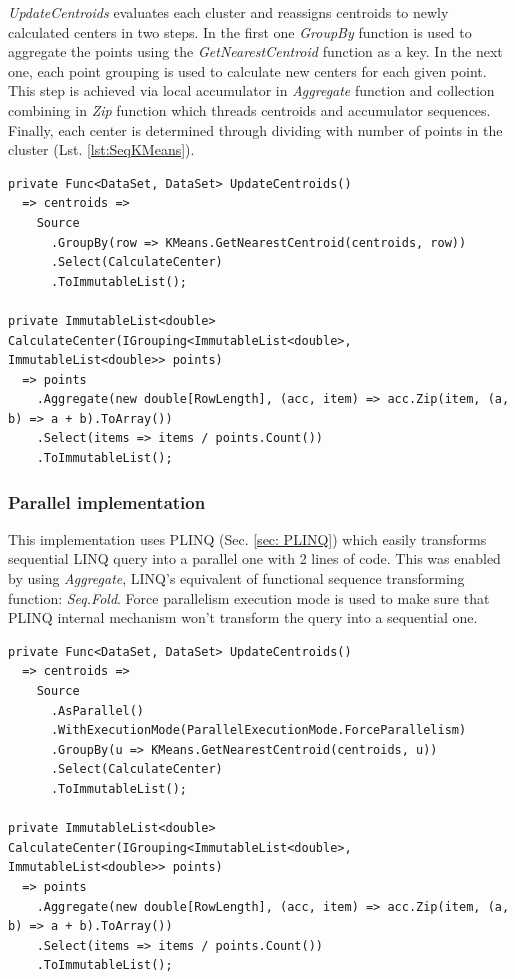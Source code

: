 \emph{UpdateCentroids} evaluates each cluster and reassigns centroids to newly calculated centers in two steps. In the first one \emph{GroupBy} function is used to aggregate the points using the \emph{GetNearestCentroid} function as a key. In the next one, each point grouping is used to calculate new centers for each given point. This step is achieved via local accumulator in \emph{Aggregate} function and collection combining in \emph{Zip} function which threads centroids and accumulator sequences. Finally, each center is determined through dividing with number of points in the cluster (Lst. \ref{lst:SeqKMeans}).


\begin{lstlisting}[style=sharpcstyle, caption={Sequential k-means algorithm}, label={lst:SeqKMeans}]
private Func<DataSet, DataSet> UpdateCentroids()
  => centroids =>
    Source
      .GroupBy(row => KMeans.GetNearestCentroid(centroids, row))
      .Select(CalculateCenter)
      .ToImmutableList();

private ImmutableList<double> CalculateCenter(IGrouping<ImmutableList<double>, ImmutableList<double>> points) 
  => points
    .Aggregate(new double[RowLength], (acc, item) => acc.Zip(item, (a, b) => a + b).ToArray())
    .Select(items => items / points.Count())
    .ToImmutableList();
\end{lstlisting}

\subsubsection{Parallel implementation}

This implementation uses PLINQ (Sec. \ref{sec: PLINQ}) which easily transforms sequential LINQ query into a parallel one with 2 lines of code.
This was enabled by using \emph{Aggregate}, LINQ's equivalent of functional sequence transforming function: \emph{Seq.Fold}. Force parallelism execution mode is used to make sure that PLINQ internal mechanism won't transform the query into a sequential one.

\begin{lstlisting}[style=sharpcstyle, caption={Parallel k-means algorithm}, label={lst:ParKMeans}]
private Func<DataSet, DataSet> UpdateCentroids()
  => centroids =>
    Source
      .AsParallel()
      .WithExecutionMode(ParallelExecutionMode.ForceParallelism)
      .GroupBy(u => KMeans.GetNearestCentroid(centroids, u))
      .Select(CalculateCenter)
      .ToImmutableList();

private ImmutableList<double> CalculateCenter(IGrouping<ImmutableList<double>, ImmutableList<double>> points)
  => points
    .Aggregate(new double[RowLength], (acc, item) => acc.Zip(item, (a, b) => a + b).ToArray())
    .Select(items => items / points.Count())
    .ToImmutableList();
\end{lstlisting}

